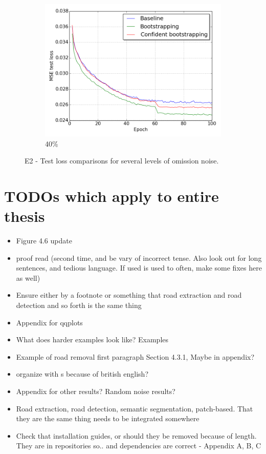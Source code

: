 \begin{figure}[H]
\begin{subfigure}{0.31\textwidth}
\end{subfigure}
\hspace*{\fill} %
\begin{subfigure}{0.31\textwidth}
\includegraphics[width=\textwidth]{figs/E2/lc_4.png}
\caption{40\%} \label{fig:app_E2_4_lc}
\vspace{-0.1cm} %
\end{subfigure}
\vspace{-0.6\baselineskip}
\caption{E2 - Test loss comparisons for several levels of omission noise.} \label{fig:E2_all_lc}
\end{figure}


\section{TODOs which apply to entire thesis}
\begin{itemize}
\item Figure 4.6 update
\item proof read (second time, and be vary of incorrect tense. Also look out for long sentences, and tedious language. If used is used to often, make some fixes here as well)
\item Ensure either by a footnote or something that road extraction and road detection and so forth is the same thing
\item Appendix for qqplots
\item What does harder examples look like? Examples
\item Example of road removal first paragraph Section 4.3.1, Maybe in appendix?
\item organize with s because of british english?
\item Appendix for other results? Random noise results? 

\item Road extraction, road detection, semantic segmentation, patch-based. That they are the same thing needs to be integrated somewhere
\item Check that installation guides, or should they be removed because of length. They are in repositories so.. and dependencies are correct - Appendix A, B, C
\end{itemize}
